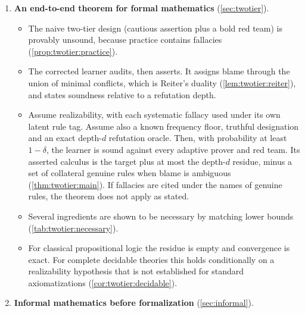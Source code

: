 \begin{enumerate}[label=\textbf{(\arabic*)}]
\begin{itemize}
  \item Carnap's categoricity problem is, in part, Gold's problem in the dual space of valuations (\cref{tab:coherence:goldcarnap}). Single-conclusion data cannot fix the classical meanings, while, among structural meanings, finitely many bilateral data plus one coherence datum can (\cref{thm:coherence:carnap,thm:coherence:telltale}); the bilateral idea is that of Shoesmith--Smiley, Rumfitt and Restall.
  \item What survives everything is the set of coherent uniform alternatives: a precise ``Kripkensteinian residue'' (\cref{thm:coherence:residue}).
  \end{itemize}
\item \textbf{An end-to-end theorem for formal mathematics} (\cref{sec:twotier}).
  \begin{itemize}
  \item The naive two-tier design (cautious assertion plus a bold red team) is provably unsound, because practice contains fallacies (\cref{prop:twotier:practice}).
  \item The corrected learner audits, then asserts. It assigns blame through the union of minimal conflicts, which is Reiter's duality (\cref{lem:twotier:reiter}), and states soundness relative to a refutation depth.
  \item Assume realizability, with each systematic fallacy used under its own latent rule tag. Assume also a known frequency floor, truthful designation and an exact depth-$d$ refutation oracle. Then, with probability at least $1-\delta$, the learner is sound against every adaptive prover and red team. Its asserted calculus is the target plus at most the depth-$d$ residue, minus a set of collateral genuine rules when blame is ambiguous (\cref{thm:twotier:main}). If fallacies are cited under the names of genuine rules, the theorem does not apply as stated.
  \item Several ingredients are shown to be necessary by matching lower bounds (\cref{tab:twotier:necessary}).
  \item For classical propositional logic the residue is empty and convergence is exact. For complete decidable theories this holds conditionally on a realizability hypothesis that is not established for standard axiomatizations (\cref{cor:twotier:decidable}).
  \end{itemize}
\item \textbf{Informal mathematics before formalization} (\cref{sec:informal}).
  \begin{itemize}

\end{itemize}
\end{enumerate}
